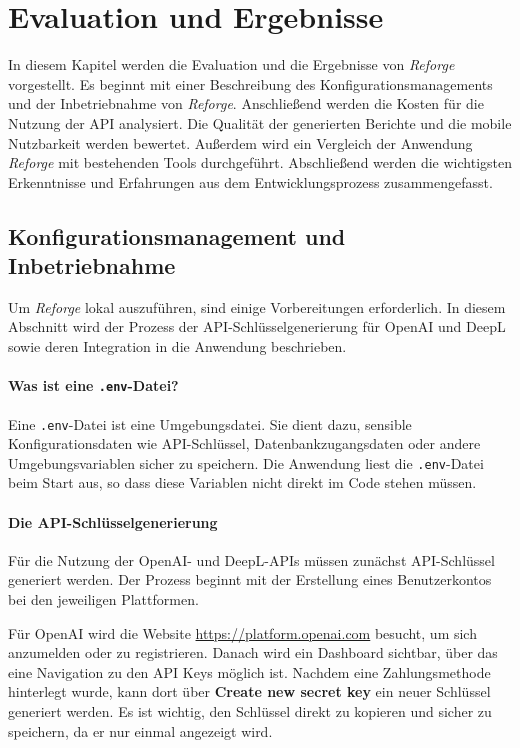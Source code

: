\chapter{Evaluation und Ergebnisse}
In diesem Kapitel werden die Evaluation und die Ergebnisse von \textit{Reforge} vorgestellt. Es beginnt mit einer Beschreibung des Konfigurationsmanagements und der Inbetriebnahme von \textit{Reforge}. Anschließend werden die Kosten für die Nutzung der API analysiert. Die Qualität der generierten Berichte und die mobile Nutzbarkeit werden bewertet. Außerdem wird ein Vergleich der Anwendung \textit{Reforge} mit bestehenden Tools durchgeführt. Abschließend werden die wichtigsten Erkenntnisse und Erfahrungen aus dem Entwicklungsprozess zusammengefasst.

\section{Konfigurationsmanagement und Inbetriebnahme}

Um \textit{Reforge} lokal auszuführen, sind einige Vorbereitungen erforderlich. In diesem Abschnitt wird der Prozess der \ac{API}-Schlüsselgenerierung für OpenAI und DeepL sowie deren Integration in die Anwendung beschrieben.

\subsubsection{Was ist eine \texttt{.env}-Datei?}

Eine \texttt{.env}-Datei ist eine Umgebungsdatei. Sie dient dazu, sensible Konfigurationsdaten wie \ac{API}-Schlüssel, Datenbankzugangsdaten oder andere Umgebungsvariablen sicher zu speichern. Die Anwendung liest die \texttt{.env}-Datei beim Start aus, so dass diese Variablen nicht direkt im Code stehen müssen.

\subsubsection{Die \ac{API}-Schlüsselgenerierung}

Für die Nutzung der OpenAI- und DeepL-\ac{API}s müssen zunächst \ac{API}-Schlüssel generiert werden. Der Prozess beginnt mit der Erstellung eines Benutzerkontos bei den jeweiligen Plattformen. 

Für OpenAI wird die Website \href{https://platform.openai.com}{https://platform.openai.com} besucht, um sich anzumelden oder zu registrieren. Danach wird ein Dashboard sichtbar, über das eine Navigation zu den \ac{API} Keys möglich ist. Nachdem eine Zahlungsmethode hinterlegt wurde, kann dort über \textbf{Create new secret key} ein neuer Schlüssel generiert werden. Es ist wichtig, den Schlüssel direkt zu kopieren und sicher zu speichern, da er nur einmal angezeigt wird.


